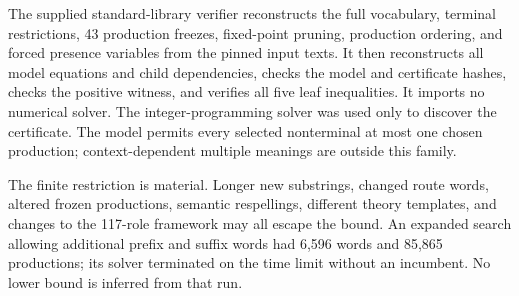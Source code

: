 The supplied standard-library verifier reconstructs the full vocabulary,
terminal restrictions, 43 production freezes, fixed-point pruning,
production ordering, and forced presence variables from the pinned input
texts. It then reconstructs all model equations and child dependencies,
checks the model and certificate hashes, checks the positive witness,
and verifies all five leaf inequalities. It imports no numerical solver.
The integer-programming solver was used only to discover the certificate.
The model permits every selected nonterminal at most one chosen
production; context-dependent multiple meanings are outside this family.

The finite restriction is material. Longer new substrings, changed route
words, altered frozen productions, semantic respellings, different theory
templates, and changes to the 117-role framework may all escape the
bound. An expanded search allowing additional prefix and suffix words
had 6,596 words and 85,865 productions; its solver terminated on the time
limit without an incumbent. No lower bound is inferred from that run.
